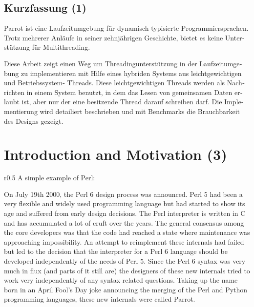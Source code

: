 \documentclass[bachelor,english]{hgbthesis}
\begin{document}
\begin{german}
\chapter{Kurzfassung (1)}

Parrot ist eine Laufzeitumgebung f{\"u}r dynamisch typisierte Programmiersprachen. Trotz mehrerer Anl{\"a}ufe in seiner zehnj{\"a}hrigen Geschichte, bietet es keine Unterst{\"u}tzung f{\"u}r Multithreading.

Diese Arbeit zeigt einen Weg um Threadingunterst{\"u}tzung in der Laufzeitumgebung zu implementieren mit Hilfe eines hybriden Systems aus leichtgewichtigen und Betriebssystem- Threads. Diese leichtgewichtigen Threads werden als Nachrichten in einem System benutzt, in dem das Lesen von gemeinsamen Daten erlaubt ist, aber nur der eine besitzende Thread darauf schreiben darf. Die Implementierung wird detailiert beschrieben und mit Benchmarks die Brauchbarkeit des Designs gezeigt.

\end{german}

\mainmatter

\chapter{Introduction and Motivation (3)}

\begin{wrapfigure}{r}{0.5\textwidth}
A simple example of Perl:

\end{wrapfigure}
%
On July 19th 2000, the Perl 6 design process was announced. Perl 5 had been a very flexible and widely used programming language but had started to show its age and suffered from early design decisions. The Perl interpreter is written in C and has accumulated a lot of cruft over the years. The general consensus among the core developers was that the code had reached a state where maintenance was approaching impossibility\cite{Masak40451}. An attempt to reimplement these internals had failed but led to the decision that the interpreter for a Perl 6 language should be developed independently of the needs of Perl 5. Since the Perl 6 syntax was very much in flux (and parts of it still are) the designers of these new internals tried to work very independently of any syntax related questions\cite{Developer}. Taking up the name born in an April Fool's Day joke announcing the merging of the Perl and Python programming languages, these new internals were called Parrot\cite{Perl}.
\end{document}
